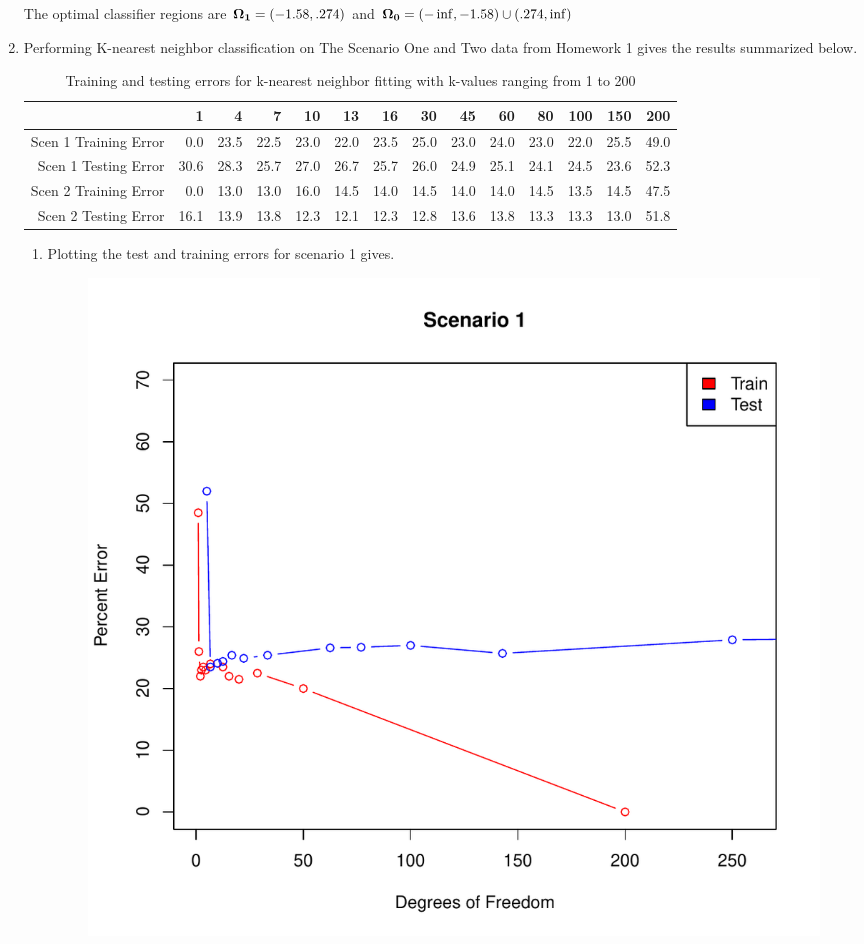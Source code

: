 \documentclass{article}
\begin{document}
\begin{enumerate}
The optimal classifier regions are $\mathbf{\Omega_{1}} = (-1.58,.274)$ and $\mathbf{\Omega_{0}} = (-\inf,-1.58) \cup (.274,\inf)$
\newpage
\item Performing K-nearest neighbor classification on The Scenario One and Two data from Homework 1 gives the results summarized below.
\begin{table}[ht]
\centering
\begin{tabular}{rrrrrrrrrrrrrr}
  \hline
 & 1 & 4 & 7 & 10 & 13 & 16 & 30 & 45 & 60 & 80 & 100 & 150 & 200 \\ 
  \hline
Scen 1 Training Error & 0.0 & 23.5 & 22.5 & 23.0 & 22.0 & 23.5 & 25.0 & 23.0 & 24.0 & 23.0 & 22.0 & 25.5 & 49.0 \\ 
  Scen 1 Testing Error & 30.6 & 28.3 & 25.7 & 27.0 & 26.7 & 25.7 & 26.0 & 24.9 & 25.1 & 24.1 & 24.5 & 23.6 & 52.3 \\ 
  Scen 2 Training Error & 0.0 & 13.0 & 13.0 & 16.0 & 14.5 & 14.0 & 14.5 & 14.0 & 14.0 & 14.5 & 13.5 & 14.5 & 47.5 \\ 
  Scen 2 Testing Error & 16.1 & 13.9 & 13.8 & 12.3 & 12.1 & 12.3 & 12.8 & 13.6 & 13.8 & 13.3 & 13.3 & 13.0 & 51.8 \\ 
   \hline
\end{tabular}
\caption{Training and testing errors for k-nearest neighbor fitting with k-values ranging from 1 to 200}
\end{table}  \begin{enumerate}
    \item Plotting the test and training errors for scenario 1 gives.
   \begin{figure}[h]
\begin{center}
\includegraphics{Homework2-004}

\end{center}
\end{figure}
\end{enumerate}
\end{enumerate}
\end{document}
